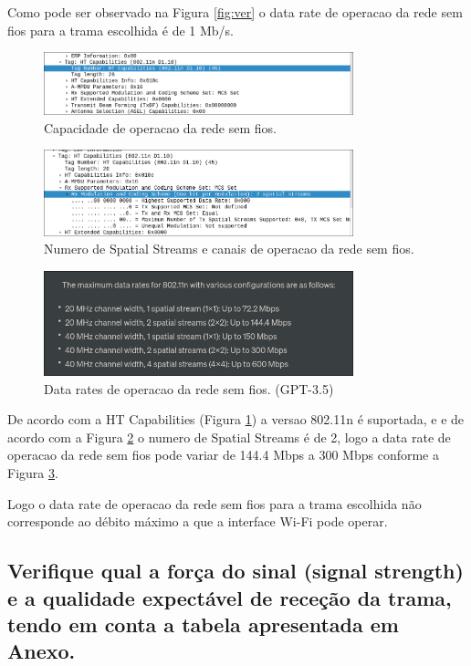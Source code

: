 \documentclass{article}
\begin{document}
Como pode ser observado na Figura \ref{fig:ver} o data rate de operacao da rede sem fios para a trama escolhida é de 1 Mb/s.

\begin{figure}[h]
    \centering
    \includegraphics[width=0.8\textwidth]{ht.png}
    \caption{\label{fig:ht}Capacidade de operacao da rede sem fios.}
\end{figure}

\begin{figure}[h]
    \centering
    \includegraphics[width=0.8\textwidth]{channels.png}
    \caption{\label{fig:channels}Numero de Spatial Streams e canais de operacao da rede sem fios.}
\end{figure}

\begin{figure}[h]
    \centering
    \includegraphics[width=0.8\textwidth]{chat.png}
    \caption{\label{fig:chat}Data rates de operacao da rede sem fios. (GPT-3.5)}
\end{figure}

De acordo com a HT Capabilities (Figura \ref{fig:ht}) a versao 802.11n é suportada, e
e de acordo com a Figura \ref{fig:channels} o numero de Spatial Streams é de 2, logo a data rate de operacao da rede sem fios pode variar de 144.4 Mbps a 300 Mbps conforme a Figura \ref{fig:chat}.

Logo o data rate de operacao da rede sem fios para a trama escolhida não corresponde ao débito máximo a que a interface Wi-Fi pode operar.

\subsection{Verifique qual a força do sinal (signal strength) e a qualidade expectável de  receção da trama, tendo em conta a tabela apresentada em Anexo.}
\end{document}
